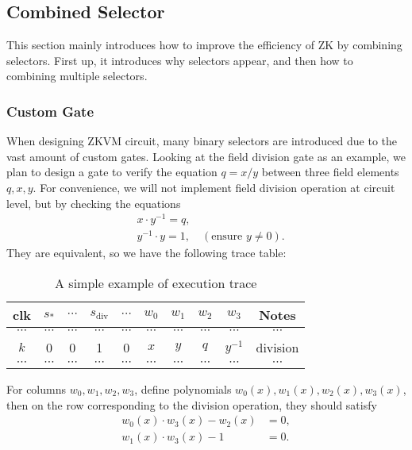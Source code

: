 \subsection{Combined Selector}

This section mainly introduces how to improve the efficiency of ZK by combining selectors. First up, it introduces why selectors appear, and then how to combining multiple selectors.

\subsubsection{Custom Gate}

When designing ZKVM circuit, many binary selectors are introduced due to the vast amount of custom gates. Looking at the field division gate as an example, we plan to design a gate to verify the equation $q = x/y$ between three field elements $q,x,y$. For convenience, we will not implement field division operation at circuit level, but by checking the equations
\begin{align*}
& x \cdot y^{-1} = q, \\
& y^{-1} \cdot y = 1, \quad (\text{ensure $y \ne 0$}).
\end{align*}
They are equivalent, so we have the following trace table:
\begin{table}[!ht]
\centering
\begin{tabular}{|c|c|c|c|c|c|c|c|c|c|}
\hline
clk & $s_*$ & $\cdots$ & $s_\text{div}$ & $\cdots$ & $w_0$ & $w_1$ & $w_2$ & $w_3$ & Notes \\
\hline
$\cdots$ & $\cdots$ & $\cdots$ & $\cdots$ & $\cdots$ & $\cdots$ & $\cdots$ & $\cdots$ & $\cdots$ & $\cdots$ \\
\hline
$k$ & 0 & 0 & 1 & 0 & $x$ & $y$ & $q$ & $y^{-1}$ & division \\
\hline
$\cdots$ & $\cdots$ & $\cdots$ & $\cdots$ & $\cdots$ & $\cdots$ & $\cdots$ & $\cdots$ & $\cdots$ & $\cdots$ \\
\hline
\end{tabular}
\caption{A simple example of execution trace}
\end{table}

For columns $w_0,w_1,w_2,w_3$, define polynomials $w_0(x),w_1(x),w_2(x),w_3(x)$, then on the row corresponding to the division operation, they should satisfy
\begin{align*}
w_0(x) \cdot w_3(x) - w_2(x) &= 0, \\
w_1(x) \cdot w_3(x) - 1 &= 0.
\end{align*}

